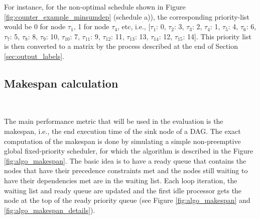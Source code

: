For instance, for the non-optimal schedule shown in Figure \ref{fig:counter_example_minsumdep} (schedule a)),
the corresponding priority-list would be 0 for node $\tau_1$, 1 for node $\tau_4$,
etc, i.e., [$\tau_1$: 0, $\tau_2$: 3, $\tau_3$: 2, $\tau_4$: 1, $\tau_5$: 4, $\tau_6$: 6, $\tau_7$: 5, $\tau_8$: 8,
 $\tau_9$: 10, $\tau_10$: 7, $\tau_11$: 9, $\tau_12$: 11, $\tau_13$: 13, $\tau_14$: 12, $\tau_15$: 14].
This priority list is then converted to a matrix by the process described
at the end of Section \ref{sec:output_labels}.

\subsection{Makespan calculation}
~
\label{sec:makespan_calculation}

The main performance metric that will be used in the evaluation
is the makespan, i.e., the end execution time of the sink node of a DAG.
The exact computation of the makespan is done by simulating a 
simple non-preemptive global fixed-priority scheduler, for which the algorithm
is described in the Figure \ref{fig:algo_makespan}.
The basic idea is to have a ready queue that contains the nodes
that have their precedence constraints met
and the nodes still waiting to have their dependencies met 
are in the waiting list. Each loop iteration, the waiting list and ready queue
are updated and the first idle processor gets the node at the top of 
the ready priority queue (see Figure \ref{fig:algo_makespan} and \ref{fig:algo_makespan_details}).


